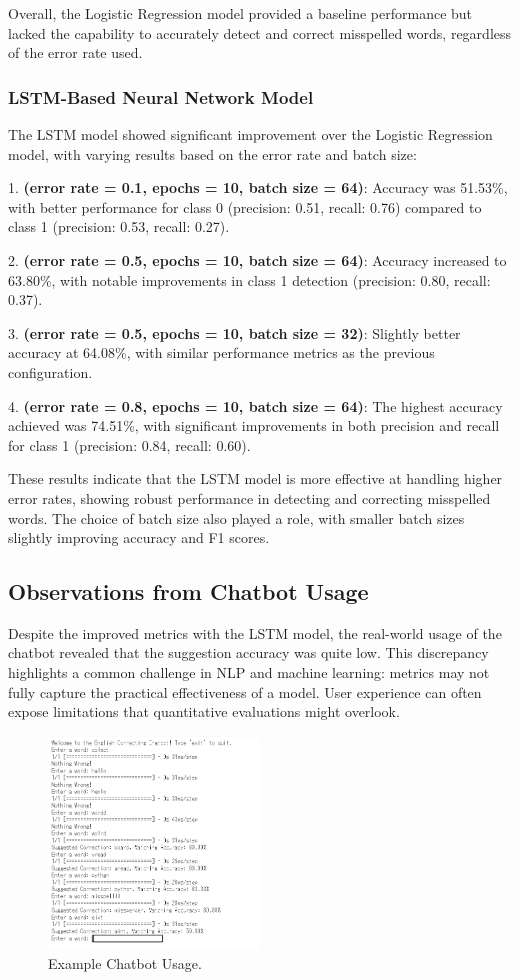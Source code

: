 Overall, the Logistic Regression model provided a baseline performance but lacked the capability to accurately detect and correct misspelled words, regardless of the error rate used.

\subsubsection{LSTM-Based Neural Network Model}

The LSTM model showed significant improvement over the Logistic Regression model, with varying results based on the error rate and batch size:

1. \textbf{(error rate = 0.1, epochs = 10, batch size = 64)}: Accuracy was 51.53\%, with better performance for class 0 (precision: 0.51, recall: 0.76) compared to class 1 (precision: 0.53, recall: 0.27).

2. \textbf{(error rate = 0.5, epochs = 10, batch size = 64)}: Accuracy increased to 63.80\%, with notable improvements in class 1 detection (precision: 0.80, recall: 0.37).

3. \textbf{(error rate = 0.5, epochs = 10, batch size = 32)}: Slightly better accuracy at 64.08\%, with similar performance metrics as the previous configuration.

4. \textbf{(error rate = 0.8, epochs = 10, batch size = 64)}: The highest accuracy achieved was 74.51\%, with significant improvements in both precision and recall for class 1 (precision: 0.84, recall: 0.60).

These results indicate that the LSTM model is more effective at handling higher error rates, showing robust performance in detecting and correcting misspelled words. The choice of batch size also played a role, with smaller batch sizes slightly improving accuracy and F1 scores.

\subsection{Observations from Chatbot Usage}

Despite the improved metrics with the LSTM model, the real-world usage of the chatbot revealed that the suggestion accuracy was quite low. This discrepancy highlights a common challenge in NLP and machine learning: metrics may not fully capture the practical effectiveness of a model. User experience can often expose limitations that quantitative evaluations might overlook.

\begin{figure}[h!]
    \centering
    \includegraphics[width=0.5\textwidth]{Figures/chatbot_display.png}
    \caption{Example Chatbot Usage.}
    \label{fig:lchatbot_display}
\end{figure}